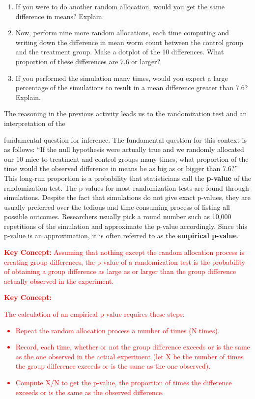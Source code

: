 \documentclass[
]{report}
\theoremstyle{definition}
\theoremstyle{definition}
\theoremstyle{definition}
\theoremstyle{definition}
\theoremstyle{remark}
\begin{document}
\begin{enumerate}
\def\labelenumi{\arabic{enumi}.}
\setcounter{enumi}{3}
\item
  If you were to do another random allocation, would you get the same difference in means? Explain.
\item
  Now, perform nine more random allocations, each time computing and writing down the difference in
  mean worm count between the control group and the treatment group. Make a dotplot of the 10 differences.
  What proportion of these differences are 7.6 or larger?
\item
  If you performed the simulation many times, would you expect a large percentage of the simulations to
  result in a mean difference greater than 7.6? Explain.
\end{enumerate}

The reasoning in the previous activity leads us to the randomization test and an interpretation of the

fundamental question for inference. The fundamental question for this context is as follows: ``If the null
hypothesis were actually true and we randomly allocated our 10 mice to treatment and control groups many
times, what proportion of the time would the observed difference in means be as big as or bigger than 7.6?''
This long-run proportion is a probability that statisticians call the \textbf{p-value} of the randomization test. The
p-values for most randomization tests are found through simulations. Despite the fact that simulations do
not give exact p-values, they are usually preferred over the tedious and time-consuming process of listing
all possible outcomes. Researchers usually pick a round number such as 10,000 repetitions of the simulation
and approximate the p-value accordingly. Since this p-value is an approximation, it is often referred to as
the \textbf{empirical p-value}.

\Large

\textbf{\textcolor{red}{Key Concept:}}
\textcolor{red}{Assuming that nothing except the random allocation process is creating group differences, the p-value
of a randomization test is the probability of obtaining a group difference as large as or larger than
the group difference actually observed in the experiment.}

\Large

\textbf{\textcolor{red}{Key Concept:}}

\textcolor{red}{The calculation of an empirical p-value requires these steps:
\begin{itemize}
\item Repeat the random allocation process a number of times (N times).
\item Record, each time, whether or not the group difference exceeds or is the same as the one
observed in the actual experiment (let X be the number of times the group difference exceeds
or is the same as the one observed).
\item Compute X/N to get the p-value, the proportion of times the difference exceeds or is the same
as the observed difference.
\end{itemize}}
\end{document}

